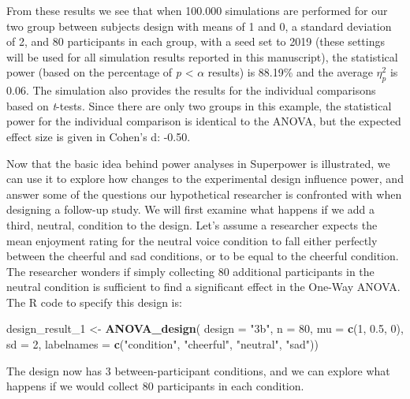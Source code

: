 \documentclass[
  ,man,floatsintext]{apa6}
\newenvironment{Shaded}{\begin{snugshade}}{\end{snugshade}}
\newcommand{\DataTypeTok}[1]{\textcolor[rgb]{0.13,0.29,0.53}{#1}}
\newcommand{\DecValTok}[1]{\textcolor[rgb]{0.00,0.00,0.81}{#1}}
\newcommand{\FloatTok}[1]{\textcolor[rgb]{0.00,0.00,0.81}{#1}}
\newcommand{\KeywordTok}[1]{\textcolor[rgb]{0.13,0.29,0.53}{\textbf{#1}}}
\newcommand{\NormalTok}[1]{#1}
\newcommand{\StringTok}[1]{\textcolor[rgb]{0.31,0.60,0.02}{#1}}
\begin{document}
From these results we see that when 100.000 simulations are performed for our two group between subjects design with means of 1 and 0, a standard deviation of 2, and 80 participants in each group, with a seed set to 2019 (these settings will be used for all simulation results reported in this manuscript), the statistical power (based on the percentage of \emph{p} \textless{} \(\alpha\) results) is 88.19\% and the average \(\eta_p^2\) is 0.06.
The simulation also provides the results for the individual comparisons based on \emph{t}-tests.
Since there are only two groups in this example, the statistical power for the individual comparison is identical to the ANOVA, but the expected effect size is given in Cohen's d: -0.50.

Now that the basic idea behind power analyses in Superpower is illustrated, we can use it to explore how changes to the experimental design influence power, and answer some of the questions our hypothetical researcher is confronted with when designing a follow-up study.
We will first examine what happens if we add a third, neutral, condition to the design.
Let's assume a researcher expects the mean enjoyment rating for the neutral voice condition to fall either perfectly between the cheerful and sad conditions, or to be equal to the cheerful condition.
The researcher wonders if simply collecting 80 additional participants in the neutral condition is sufficient to find a significant effect in the One-Way ANOVA.
The R code to specify this design is:

\begin{Shaded}
\begin{Highlighting}[]
\NormalTok{design_result_}\DecValTok{1}\NormalTok{ <-}\StringTok{ }\KeywordTok{ANOVA_design}\NormalTok{(}
  \DataTypeTok{design =} \StringTok{"3b"}\NormalTok{, }
  \DataTypeTok{n =} \DecValTok{80}\NormalTok{, }
  \DataTypeTok{mu =} \KeywordTok{c}\NormalTok{(}\DecValTok{1}\NormalTok{, }\FloatTok{0.5}\NormalTok{, }\DecValTok{0}\NormalTok{),}
  \DataTypeTok{sd =} \DecValTok{2}\NormalTok{, }
  \DataTypeTok{labelnames =} \KeywordTok{c}\NormalTok{(}\StringTok{"condition"}\NormalTok{, }\StringTok{"cheerful"}\NormalTok{, }\StringTok{"neutral"}\NormalTok{, }\StringTok{"sad"}\NormalTok{))}
\end{Highlighting}
\end{Shaded}

The design now has 3 between-participant conditions, and we can explore what happens if we would collect 80 participants in each condition.
\end{document}
